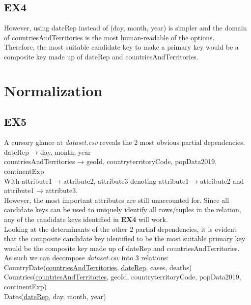 \documentclass{article}
\begin{document}
\subsection{EX4}
However, using dateRep instead of (day, month, year) is simpler and the domain of countriesAndTerritories is the most human-readable of the options. \\

Therefore, the most suitable candidate key to make a primary key would be a composite key made up of dateRep and countriesAndTerritories.
\section{Normalization}
\subsection{EX5}
A cursory glance at \textit{dataset.csv} reveals the 2 most obvious partial dependencies. \\
\indent dateRep → day, month, year \\
\indent countriesAndTerritories → geoId, countryterritoryCode, popData2019, continentExp \\

With attribute1 → attribute2, attribute3 denoting attribute1 → attribute2 and attribute1 → attribute3. \\

However, the most important attributes are still unaccounted for. Since all candidate keys can be used to uniquely identify all rows/tuples in the relation, any of the candidate keys identified in \textbf{EX4} will work. \\

Looking at the determinants of the other 2 partial dependencies, it is evident that the composite candidate key identified to be the most suitable primary key would be the composite key made up of dateRep and countriesAndTerritories. \\

As such we can decompose \textit{dataset.csv} into 3 relations: \\
\indent CountryDate(\underline{countriesAndTerritories}, \underline{dateRep}, cases, deaths) \\
\indent Countries(\underline{countriesAndTerritories}, geoId, countryterritoryCode, popData2019, continentExp) \\
\indent Dates(\underline{dateRep}, day, month, year) \\
\end{document}
